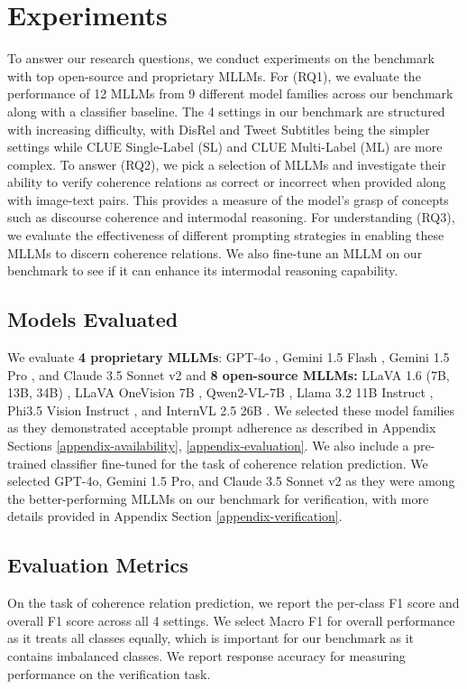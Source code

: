 \section{Experiments} 
To answer our research questions, we conduct experiments on the {\name} benchmark with top open-source and proprietary MLLMs. For (RQ1), we evaluate the performance of 12 MLLMs from 9 different model families across our benchmark along with a classifier baseline. The 4 settings in our benchmark are structured with increasing difficulty, with DisRel and Tweet Subtitles being the simpler settings while CLUE Single-Label (SL) and CLUE Multi-Label (ML) are more complex. To answer (RQ2), we pick a selection of MLLMs and investigate their ability to verify coherence relations as correct or incorrect when provided along with image-text pairs. This provides a measure of the model's grasp of concepts such as discourse coherence and intermodal reasoning. For understanding (RQ3), we evaluate the effectiveness of different prompting strategies in enabling these MLLMs to discern coherence relations. We also fine-tune an MLLM on our benchmark to see if it can enhance its intermodal reasoning capability.


\subsection{Models Evaluated} \label{models-evaluated}
We evaluate \textbf{4 proprietary MLLMs}: GPT-4o \cite{OpenAI2024-hr}, Gemini 1.5 Flash \cite{Pichai2024-xj}, Gemini 1.5 Pro \cite{Pichai2024-xj}, and Claude 3.5 Sonnet v2 \cite{AnthropicUnknown-hu} and \textbf{8 open-source MLLMs:} LLaVA 1.6 (7B, 13B, 34B) \cite{Liu2024-il}, LLaVA OneVision 7B \cite{Li2025-ad}, Qwen2-VL-7B \cite{Wang2024-fa}, Llama 3.2 11B Instruct \cite{Meta-AIUnknown-ot}, Phi3.5 Vision Instruct \cite{Abdin2024-vk}, and InternVL 2.5 26B \cite{Chen2024-yg}. We selected these model families as they demonstrated acceptable prompt adherence as described in Appendix Sections \ref{appendix-availability}, \ref{appendix-evaluation}. We also include a pre-trained classifier fine-tuned for the task of coherence relation prediction. We selected GPT-4o, Gemini 1.5 Pro, and Claude 3.5 Sonnet v2 as they were among the better-performing MLLMs on our benchmark for verification, with more details provided in Appendix Section \ref{appendix-verification}.

\subsection{Evaluation Metrics} \label{eval-metrics}
On the task of coherence relation prediction, we report the per-class F1 score and overall F1 score across all 4 settings. We select Macro F1 for overall performance as it treats all classes equally, which is important for our benchmark as it contains imbalanced classes. We report response accuracy for measuring performance on the verification task.

